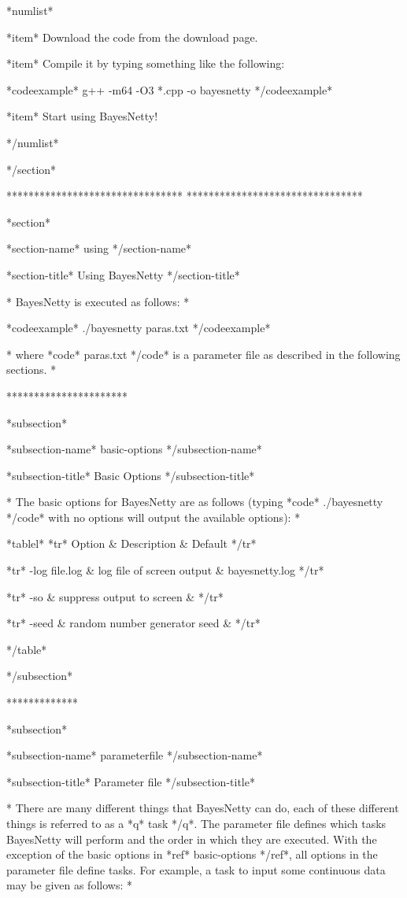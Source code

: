 *numlist*

*item* Download the code from the download page.

*item* Compile it by typing something like the following:

*codeexample* g++ -m64 -O3 *.cpp -o bayesnetty */codeexample*

*item* Start using BayesNetty!

*/numlist*

*/section*

******************************** ********************************

*section*

*section-name* using */section-name*

*section-title* Using BayesNetty */section-title*


* BayesNetty is executed as follows: *

*codeexample*
 ./bayesnetty paras.txt
*/codeexample*


* where *code* paras.txt */code* is a parameter file as described in the following sections. *


**********************

*subsection*

*subsection-name* basic-options */subsection-name*

*subsection-title* Basic Options */subsection-title*

* The basic options for BayesNetty are as follows (typing *code* ./bayesnetty */code* with no options will output the available options): *

*tablel* *tr* Option & Description & Default */tr*

*tr*
 -log file.log & log file of screen output & bayesnetty.log
*/tr*

*tr*
  -so           & suppress output to screen &
*/tr*


*tr*
  -seed           & random number generator seed &
*/tr*

*/table*

*/subsection*

*************

*subsection*

*subsection-name* parameterfile */subsection-name*

*subsection-title* Parameter file */subsection-title*

* There are many different things that BayesNetty can do, each of these different things is referred to as a *q* task */q*. The parameter file defines which tasks BayesNetty will perform and the order in which they are executed. With the exception of the basic options in *ref* basic-options */ref*, all options in the parameter file define tasks. For example, a task to input some continuous data may be given as follows: *

